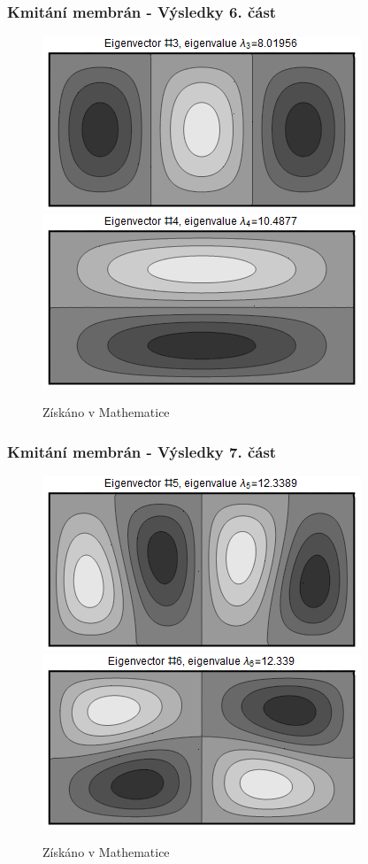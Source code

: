 \documentclass{beamer}
\begin{document}
\begin{frame}
\frametitle{Kmitání membrán - Výsledky 6. část}
\centering
\begin{figure}
\includegraphics[width=.6\linewidth]{rectangle-eigenvector-3.png}
\includegraphics[width=.6\linewidth]{rectangle-eigenvector-4.png}
\caption{Získáno v Mathematice}
\end{figure}
\end{frame}

\begin{frame}
\frametitle{Kmitání membrán - Výsledky 7. část}
\centering
\begin{figure}
\includegraphics[width=.6\linewidth]{rectangle-eigenvector-5.png}
\includegraphics[width=.6\linewidth]{rectangle-eigenvector-6.png}
\caption{Získáno v Mathematice}
\end{figure}
\end{frame}
\end{document}
